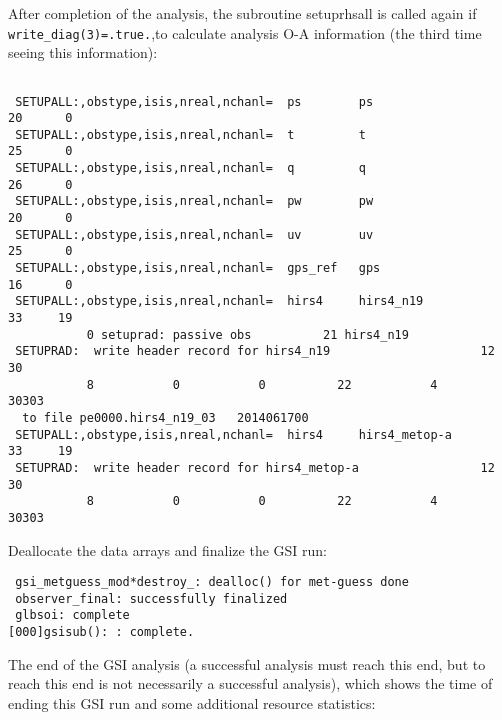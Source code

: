 After completion of the analysis, the subroutine setuprhsall is called again if \verb|write_diag(3)=.true.|,to calculate analysis O-A information (the third time seeing this information):
\begin{scriptsize}
\begin{verbatim}

 SETUPALL:,obstype,isis,nreal,nchanl=  ps        ps                       20      0
 SETUPALL:,obstype,isis,nreal,nchanl=  t         t                        25      0
 SETUPALL:,obstype,isis,nreal,nchanl=  q         q                        26      0
 SETUPALL:,obstype,isis,nreal,nchanl=  pw        pw                       20      0
 SETUPALL:,obstype,isis,nreal,nchanl=  uv        uv                       25      0
 SETUPALL:,obstype,isis,nreal,nchanl=  gps_ref   gps                      16      0
 SETUPALL:,obstype,isis,nreal,nchanl=  hirs4     hirs4_n19                33     19
           0 setuprad: passive obs          21 hirs4_n19
 SETUPRAD:  write header record for hirs4_n19                     12          30
           8           0           0          22           4       30303
  to file pe0000.hirs4_n19_03   2014061700
 SETUPALL:,obstype,isis,nreal,nchanl=  hirs4     hirs4_metop-a            33     19
 SETUPRAD:  write header record for hirs4_metop-a                 12          30
           8           0           0          22           4       30303

\end{verbatim}
\end{scriptsize}
Deallocate the data arrays and finalize the GSI run:
\begin{scriptsize}
\begin{verbatim}
 gsi_metguess_mod*destroy_: dealloc() for met-guess done
 observer_final: successfully finalized
 glbsoi: complete
[000]gsisub(): : complete.
\end{verbatim}
\end{scriptsize}
The end of the GSI analysis (a successful analysis must reach this end, but to reach this end is not necessarily a successful analysis), which shows the time of ending this GSI run and some additional resource statistics:
